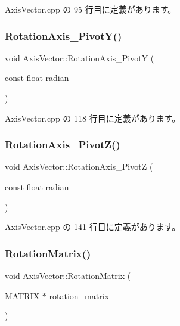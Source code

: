  Axis\+Vector.\+cpp の 95 行目に定義があります。

\mbox{\label{class_axis_vector_aee4198c9fcf78d6912b129e2210a58fa}} 
\subsubsection{\texorpdfstring{Rotation\+Axis\+\_\+\+Pivot\+Y()}{RotationAxis\_PivotY()}}
{\footnotesize\ttfamily void Axis\+Vector\+::\+Rotation\+Axis\+\_\+\+PivotY (\begin{DoxyParamCaption}\item[{const float}]{radian }\end{DoxyParamCaption})}



 Axis\+Vector.\+cpp の 118 行目に定義があります。

\mbox{\label{class_axis_vector_adde5b636a046a4fe6c5c943646045843}} 
\subsubsection{\texorpdfstring{Rotation\+Axis\+\_\+\+Pivot\+Z()}{RotationAxis\_PivotZ()}}
{\footnotesize\ttfamily void Axis\+Vector\+::\+Rotation\+Axis\+\_\+\+PivotZ (\begin{DoxyParamCaption}\item[{const float}]{radian }\end{DoxyParamCaption})}



 Axis\+Vector.\+cpp の 141 行目に定義があります。

\mbox{\label{class_axis_vector_a33aab769ff2de997393c13414fa23873}} 
\subsubsection{\texorpdfstring{Rotation\+Matrix()}{RotationMatrix()}}
{\footnotesize\ttfamily void Axis\+Vector\+::\+Rotation\+Matrix (\begin{DoxyParamCaption}\item[{\mbox{\hyperlink{_vector3_d_8h_a032295cd9fb1b711757c90667278e744}{M\+A\+T\+R\+IX}} $\ast$}]{rotation\+\_\+matrix }\end{DoxyParamCaption})}



